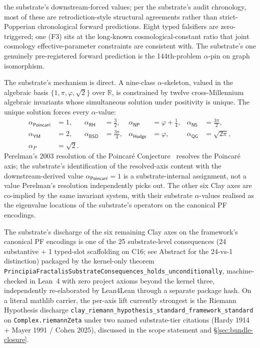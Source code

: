 \documentclass[11pt,a4paper]{amsart}
\theoremstyle{plain}
\theoremstyle{definition}
\begin{document}
the substrate's downstream-forced values; per the substrate's audit chronology, most of these are retrodiction-style structural agreements rather than strict-Popperian chronological forward predictions. Eight typed falsifiers are zero-triggered; one (F3) sits at the long-known cosmological-constant ratio that joint cosmology effective-parameter constraints are consistent with. The substrate's one genuinely pre-registered forward prediction is the 144th-problem $\alpha$-pin on graph isomorphism.

The substrate's mechanism is direct. A nine-class $\alpha$-skeleton, valued in the algebraic basis $\{1,\pi,\varphi,\sqrt{2}\}$ over $\mathbb{R}$, is constrained by twelve cross-Millennium algebraic invariants whose simultaneous solution under positivity is unique. The unique solution forces every $\alpha$-value:
\[
\begin{aligned}
\alpha_{\textsf{Poincar\'e}} &= 1, &
\alpha_{\textsf{RH}} &= \tfrac{3}{2}, &
\alpha_{\textsf{NP}} &= \varphi + \tfrac{1}{4}, &
\alpha_{\textsf{NS}} &= \tfrac{3\pi}{2},\\
\alpha_{\textsf{YM}} &= 2, &
\alpha_{\textsf{BSD}} &= \tfrac{3\pi}{4}, &
\alpha_{\textsf{Hodge}} &= \varphi, &
\alpha_{\textsf{QG}} &= \sqrt{2\pi},\\
\alpha_{P} &= \sqrt{2}. & & & & & &
\end{aligned}
\]
Perelman's 2003 resolution of the Poincar\'e Conjecture~\cite{perelman2003} resolves the Poincar\'e axis; the substrate's identification of the resolved-axis content with the downstream-derived value $\alpha_{\textsf{Poincar\'e}}=1$ is a substrate-internal assignment, not a value Perelman's resolution independently picks out. The other six Clay axes are co-implied by the same invariant system, with their substrate $\alpha$-values realised as the eigenvalue locations of the substrate's operators on the canonical PF encodings.

The substrate's discharge of the six remaining Clay axes on the framework's canonical PF encodings is one of the 25 substrate-level consequences (24 substantive + 1 typed-slot scaffolding on C16; see Abstract for the 24-vs-1 distinction) packaged by the kernel-only theorem \texttt{PrincipiaFractalisSubstrateConsequences\_holds\_unconditionally}, machine-checked in Lean~4 with zero project axioms beyond the kernel three, independently re-elaborated by Lean4Lean through a separate package hash. On a literal mathlib carrier, the per-axis lift currently strongest is the Riemann Hypothesis discharge \texttt{clay\_riemann\_hypothesis\_standard\_framework\_standard} on \texttt{Complex.riemannZeta} under two named substrate-tier citations (Hardy 1914 + Mayer 1991 / Cohen 2025), discussed in the scope statement and \S\ref{sec:bundle-closure}.
\end{document}
